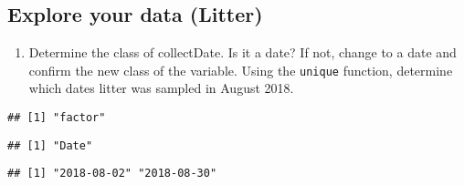 \documentclass[
]{article}
\newenvironment{Shaded}{\begin{snugshade}}{\end{snugshade}}
\newcommand{\DataTypeTok}[1]{\textcolor[rgb]{0.13,0.29,0.53}{#1}}
\newcommand{\KeywordTok}[1]{\textcolor[rgb]{0.13,0.29,0.53}{\textbf{#1}}}
\newcommand{\NormalTok}[1]{#1}
\newcommand{\OperatorTok}[1]{\textcolor[rgb]{0.81,0.36,0.00}{\textbf{#1}}}
\newcommand{\StringTok}[1]{\textcolor[rgb]{0.31,0.60,0.02}{#1}}
\providecommand{\tightlist}{%
  \setlength{\itemsep}{0pt}\setlength{\parskip}{0pt}}
\begin{document}
\hypertarget{explore-your-data-litter}{%
\subsection{Explore your data (Litter)}\label{explore-your-data-litter}}

\begin{enumerate}
\def\labelenumi{\arabic{enumi}.}
\setcounter{enumi}{11}
\tightlist
\item
  Determine the class of collectDate. Is it a date? If not, change to a
  date and confirm the new class of the variable. Using the
  \texttt{unique} function, determine which dates litter was sampled in
  August 2018.
\end{enumerate}

\begin{Shaded}
\end{Shaded}

\begin{verbatim}
## [1] "factor"
\end{verbatim}

\begin{Shaded}
\end{Shaded}

\begin{verbatim}
## [1] "Date"
\end{verbatim}

\begin{Shaded}
\end{Shaded}

\begin{verbatim}
## [1] "2018-08-02" "2018-08-30"
\end{verbatim}
\end{document}
